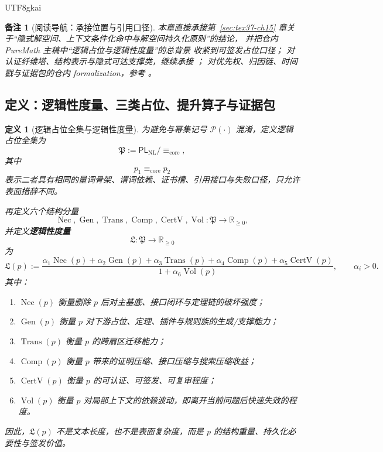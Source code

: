 \documentclass[12pt]{article}
\newtheorem{definition}{定义}[section]
\newtheorem{remark}{备注}[section]
\begin{document}
\begin{CJK*}{UTF8}{gkai}
\begin{remark}[阅读导航：承接位置与引用口径]
本章直接承接第~\ref{sec:tex37-ch15} 章关于“隐式解空间、上下文条件化命中与解空间持久化原则”的结论，
并把仓内 PureMath 主稿中“逻辑占位与逻辑性度量”的总背景 \cite{GaoZheng2025GFramework}
收紧到可签发占位口径；
对认证纤维塔、结构表示与隐式可达支撑类，继续承接 \cite{RepoTex35ExtendedCertificationTower,RepoTex36HomotopyTwistBijection}；
对优先权、归因链、时间戳与证据包的仓内 formalization，参考 \cite{RepoTex23PriorityGovernance}。
\end{remark}

\subsection{定义：逻辑性度量、三类占位、提升算子与证据包}
\label{subsec:tex37-ch16-def}

\begin{definition}[逻辑占位全集与逻辑性度量]
\label{def:tex37-ch16-logicity}
为避免与幂集记号 $\mathcal P(\cdot)$ 混淆，定义逻辑占位全集为
\[
  \mathfrak P
  :=
  \mathsf{PL}_{\mathrm{NL}}/\!\equiv_{\mathrm{core}},
\]
其中
\[
  p_1\equiv_{\mathrm{core}}p_2
\]
表示二者具有相同的量词骨架、谓词依赖、证书槽、引用接口与失败口径，只允许表面措辞不同。

再定义六个结构分量
\[
  \operatorname{Nec},\operatorname{Gen},\operatorname{Trans},
  \operatorname{Comp},\operatorname{CertV},\operatorname{Vol}
  :\mathfrak P\to\mathbb R_{\ge 0},
\]
并定义\textbf{逻辑性度量}
\[
  \mathfrak L:\mathfrak P\to \mathbb R_{\ge 0}
\]
为
\[
  \mathfrak L(p)
  :=
  \frac{
    \alpha_1\operatorname{Nec}(p)
    +
    \alpha_2\operatorname{Gen}(p)
    +
    \alpha_3\operatorname{Trans}(p)
    +
    \alpha_4\operatorname{Comp}(p)
    +
    \alpha_5\operatorname{CertV}(p)
  }{
    1+\alpha_6\operatorname{Vol}(p)
  },
  \qquad
  \alpha_i>0.
\]
其中：
\begin{enumerate}
  \item $\operatorname{Nec}(p)$ 衡量删除 $p$ 后对主基底、接口闭环与定理链的破坏强度；
  \item $\operatorname{Gen}(p)$ 衡量 $p$ 对下游占位、定理、插件与规则族的生成/支撑能力；
  \item $\operatorname{Trans}(p)$ 衡量 $p$ 的跨扇区迁移能力；
  \item $\operatorname{Comp}(p)$ 衡量 $p$ 带来的证明压缩、接口压缩与搜索压缩收益；
  \item $\operatorname{CertV}(p)$ 衡量 $p$ 的可认证、可签发、可复审程度；
  \item $\operatorname{Vol}(p)$ 衡量 $p$ 对局部上下文的依赖波动，即离开当前问题后快速失效的程度。
\end{enumerate}
因此，$\mathfrak L(p)$ 不是文本长度，也不是表面复杂度，而是 $p$ 的结构重量、持久化必要性与签发价值。
\end{definition}


\end{CJK*}
\end{document}
